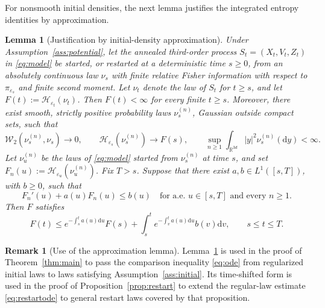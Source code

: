 \documentclass[11pt]{article}
\newtheorem{lemma}[theorem]{Lemma}
\theoremstyle{definition}
\newtheorem{remark}[theorem]{Remark}
\newcommand{\R}{\mathbb R}
\newcommand{\dd}{\mathrm d}
\newcommand{\cH}{\mathcal H}
\newcommand{\eps}{\varepsilon}
\begin{document}
For nonsmooth initial densities, the next lemma justifies the integrated
entropy identities by approximation.

\begin{lemma}[Justification by initial-density approximation]\label{lem:closure}
Under Assumption~\ref{ass:potential}, let the annealed third-order process
$S_t=(X_t,V_t,Z_t)$ in \eqref{eq:model} be started, or restarted
at a deterministic time $s\geq0$, from
an absolutely continuous law $\nu_s$ with finite relative Fisher information with
respect to $\pi_{\eps_s}$ and finite second moment. Let $\nu_t$ denote the
law of $S_t$ for $t\geq s$, and let $F(t):=\cH_{\eps_t}(\nu_t)$. Then
$F(t)<\infty$ for every finite $t\geq s$.
Moreover, there exist smooth, strictly positive probability laws
$\nu_s^{(n)}$, Gaussian outside compact sets, such that
\[
 \mathcal W_2\left(\nu_s^{(n)},\nu_s\right)\to0,\qquad
 \cH_{\eps_s}\left(\nu_s^{(n)}\right)\to F(s),\qquad
 \sup_{n\geq1}\int_{\R^{3d}}|y|^2\nu_s^{(n)}(\dd y)<\infty.
\]
Let $\nu_u^{(n)}$ be the laws of \eqref{eq:model} started from $\nu_s^{(n)}$
at time $s$, and set $F_n(u):=\cH_{\eps_u}\left(\nu_u^{(n)}\right)$.
Fix $T>s$.
Suppose that there exist $a,b\in L^1([s,T])$, with $b\geq0$, such that
\begin{equation}\label{eq:abstractcomparison}
 F_n'(u)+a(u)F_n(u)\leq b(u)
 \quad\text{for a.e. }u\in[s,T]\text{ and every }n\geq1.
\end{equation}
Then $F$ satisfies
\begin{equation}\label{eq:abstractintegrated}
 F(t)\leq e^{-\int_s^t a(u)\dd u}F(s)
 +\int_s^t e^{-\int_v^t a(u)\dd u}b(v)\dd v,
 \qquad s\leq t\leq T.
\end{equation}
\end{lemma}

\begin{remark}[Use of the approximation lemma]
Lemma~\ref{lem:closure} is used in the proof of
Theorem~\ref{thm:main} to pass the comparison inequality
\eqref{eq:ode} from regularized initial laws to laws satisfying
Assumption~\ref{ass:initial}. Its time-shifted form is used in the proof
of Proposition~\ref{prop:restart} to extend the regular-law estimate
\eqref{eq:restartode} to general restart laws covered by that proposition.
\end{remark}
\end{document}
